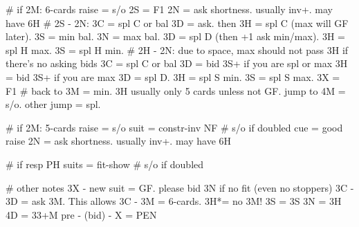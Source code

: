 # if 2M: 6-cards
raise = s/o
2S = F1
2N = ask shortness. usually inv+. may have 6H
    # 2S - 2N:
    3C = spl C or bal
        3D = ask. then 3H = spl C (max will GF later). 3S = min bal. 3N = max bal.
    3D = spl D (then +1 ask min/max). 3H = spl H max. 3S = spl H min.
    # 2H - 2N: due to space, max should not pass 3H if there's no asking bids
    3C = spl C or bal
        3D = bid 3S+ if you are spl or max
        3H = bid 3S+ if you are max
    3D = spl D. 3H = spl S min. 3S = spl S max.
3X = F1  # back to 3M = min. 3H usually only 5 cards unless not GF.
jump to 4M = s/o. other jump = spl.

# if 2M: 5-cards
raise = s/o
suit = constr-inv NF  # s/o if doubled
cue = good raise
2N = ask shortness. usually inv+. may have 6H

# if resp PH
suits = fit-show  # s/o if doubled

# other notes
3X - new suit = GF. please bid 3N if no fit (even no stoppers)
3C - 3D = ask 3M. This allows 3C - 3M = 6-cards.
    3H*= no 3M!
    3S = 3S
    3N = 3H
    4D = 33+M
pre - (bid) - X = PEN